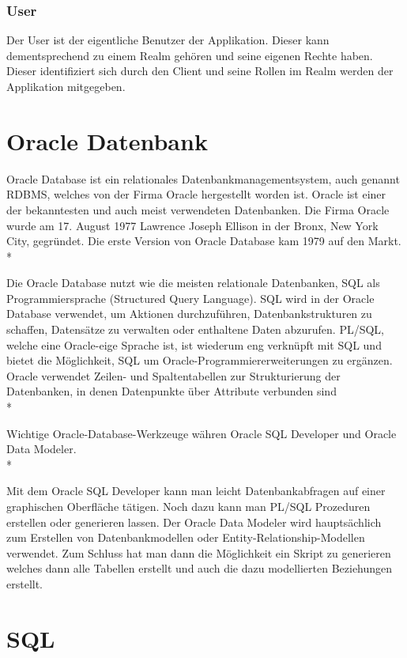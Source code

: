\subsubsection{User}
Der User ist der eigentliche Benutzer der Applikation. Dieser kann dementsprechend zu einem Realm gehören und seine eigenen Rechte haben.
Dieser identifiziert sich durch den Client und seine Rollen im Realm werden der Applikation mitgegeben.


\section{Oracle Datenbank}
\author{David Ignjatovic}
Oracle Database ist ein relationales Datenbankmanagementsystem, auch genannt RDBMS, welches von der Firma Oracle hergestellt worden ist. 
Oracle ist einer der bekanntesten und auch meist verwendeten Datenbanken. Die Firma Oracle wurde am 17. August 1977 Lawrence Joseph Ellison in der Bronx, New York City, gegründet.
Die erste Version von Oracle Database kam 1979 auf den Markt. \cite{OracleDB} \\*

Die Oracle Database nutzt wie die meisten relationale Datenbanken, SQL als Programmiersprache (Structured Query Language).
SQL wird in der Oracle Database verwendet, um Aktionen durchzuführen, Datenbankstrukturen zu schaffen, Datensätze zu verwalten oder enthaltene Daten abzurufen. 
PL/SQL, welche eine Oracle-eige Sprache ist, ist wiederum eng verknüpft mit SQL und bietet die Möglichkeit, SQL um Oracle-Programmiererweiterungen zu ergänzen. 
Oracle verwendet Zeilen- und Spaltentabellen zur Strukturierung der Datenbanken, in denen Datenpunkte über Attribute verbunden sind \cite{OracleDB} \\*

Wichtige Oracle-Database-Werkzeuge währen Oracle SQL Developer und Oracle Data Modeler. \\*

Mit dem Oracle SQL Developer kann man leicht Datenbankabfragen auf einer graphischen Oberfläche tätigen. Noch dazu kann man PL/SQL Prozeduren erstellen oder generieren lassen.
Der Oracle Data Modeler wird hauptsächlich zum Erstellen von Datenbankmodellen oder Entity-Relationship-Modellen verwendet. Zum Schluss hat man dann die Möglichkeit ein Skript 
zu generieren welches dann alle Tabellen erstellt und auch die dazu modellierten Beziehungen erstellt.

\section{SQL}
\author{David Ignjatovic}

